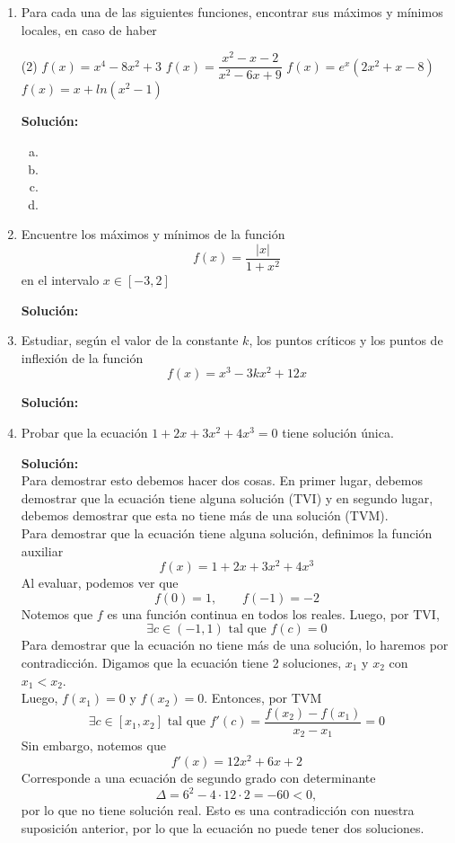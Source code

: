 \documentclass[12pt]{article}
\newenvironment{solucion}
{\begin{mdframed}[backgroundcolor=black!10]
		{\bf Solución:}\\
	}
	{
	\end{mdframed}
}
\newenvironment{preguntas}
{\begin{enumerate}\itemsep12pt
	}
	{
	\end{enumerate}
}
\begin{document}
\begin{preguntas}
\item Para cada una de las siguientes funciones, encontrar sus máximos y mínimos locales, en caso de haber
\begin{tasks}(2)
\task $f(x) = x^4 - 8x^2 + 3$
\task $f(x) = \dfrac{x^2-x-2}{x^2-6x+9}$
\task $f(x) = e^x(2x^2+x-8)$
\task $f(x)=x+ln(x^2-1)$
\end{tasks}
\begin{solucion}

\begin{enumerate}[a)]
\item 
\item 
\item 
\item 
\end{enumerate}
\end{solucion}
\item Encuentre los máximos y mínimos de la función
$$f(x) = \dfrac{|x|}{1+x^2}$$
en el intervalo $x \in [-3,2]$
\begin{solucion}

\end{solucion}
\item Estudiar, según el valor de la constante $k$, los puntos críticos y los puntos de inflexión de la función
$$f(x) = x^3-3kx^2+12x$$
\begin{solucion}

\end{solucion}
\item Probar que la ecuación $1+2x+3x^2+4x^3=0$ tiene solución única.
\begin{solucion}
Para demostrar esto debemos hacer dos cosas. En primer lugar, debemos demostrar que la ecuación tiene alguna solución (TVI) y en segundo lugar, debemos demostrar que esta no tiene más de una solución (TVM).\\

Para demostrar que la ecuación tiene alguna solución, definimos la función auxiliar
$$f(x) = 1+2x+3x^2+4x^3$$
Al evaluar, podemos ver que
$$f(0) = 1, \qquad f(-1) = -2$$
Notemos que $f$ es una función continua en todos los reales. Luego, por TVI, 
$$\exists c \in (-1,1) \text{ tal que } f(c) = 0$$
Para demostrar que la ecuación no tiene más de una solución, lo haremos por contradicción. Digamos que la ecuación tiene 2 soluciones, $x_1$ y $x_2$ con $x_1 < x_2$.\\

Luego, $f(x_1) = 0$ y $f(x_2) = 0$. Entonces, por TVM
$$\exists c \in [x_1, x_2] \text{ tal que } f'(c) = \dfrac{f(x_2) - f(x_1)}{x_2-x_1} = 0$$
Sin embargo, notemos que
$$f'(x) = 12x^2 + 6x + 2$$
Corresponde a una ecuación de segundo grado con determinante 
$$\Delta = 6^2-4\cdot 12 \cdot 2 = -60 < 0,$$
por lo que no tiene solución real. Esto es una contradicción con nuestra suposición anterior, por lo que la ecuación no puede tener dos soluciones.\\


\end{solucion}
\end{preguntas}
\end{document}
